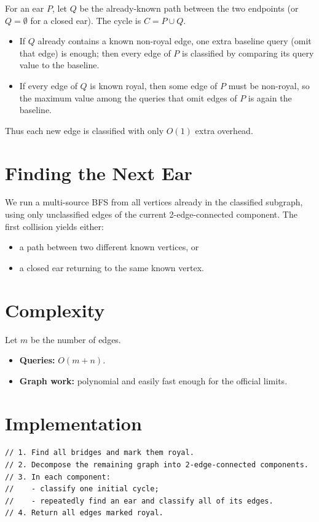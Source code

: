 \documentclass[11pt,a4paper]{article}
\begin{document}
For an ear $P$, let $Q$ be the already-known path between the two endpoints
(or $Q=\emptyset$ for a closed ear).
The cycle is $C=P \cup Q$.

\begin{itemize}
  \item If $Q$ already contains a known non-royal edge, one extra baseline query (omit that edge)
        is enough; then every edge of $P$ is classified by comparing its query value to the baseline.
  \item If every edge of $Q$ is known royal, then some edge of $P$ must be non-royal, so the
        maximum value among the queries that omit edges of $P$ is again the baseline.
\end{itemize}

Thus each new edge is classified with only $O(1)$ extra overhead.

\section{Finding the Next Ear}
We run a multi-source BFS from all vertices already in the classified subgraph, using only
unclassified edges of the current 2-edge-connected component.
The first collision yields either:
\begin{itemize}
  \item a path between two different known vertices, or
  \item a closed ear returning to the same known vertex.
\end{itemize}

\section{Complexity}
Let $m$ be the number of edges.
\begin{itemize}
  \item \textbf{Queries:} $O(m+n)$.
  \item \textbf{Graph work:} polynomial and easily fast enough for the official limits.
\end{itemize}

\section{Implementation}
\begin{lstlisting}
// 1. Find all bridges and mark them royal.
// 2. Decompose the remaining graph into 2-edge-connected components.
// 3. In each component:
//    - classify one initial cycle;
//    - repeatedly find an ear and classify all of its edges.
// 4. Return all edges marked royal.
\end{lstlisting}
\end{document}
